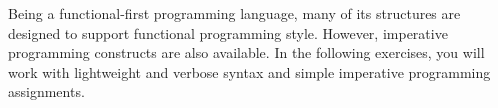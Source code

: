 Being a functional-first programming language, many of its structures are designed to support functional programming style. However, imperative programming constructs are also available. In the following exercises, you will work with lightweight and verbose syntax and simple imperative programming assignments. 